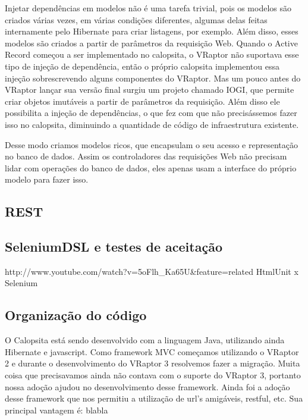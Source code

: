 Injetar dependências em modelos não é uma tarefa trivial, pois os modelos são criados várias vezes, em várias condições
diferentes, algumas delas feitas internamente pelo Hibernate para criar listagens, por exemplo. Além disso, esses
modelos são criados a partir de parâmetros da requisição Web. Quando o Active Record começou a ser implementado no 
calopsita, o VRaptor não suportava esse tipo de injeção de dependência, então o próprio calopsita implementou essa
injeção sobrescrevendo alguns componentes do VRaptor. Mas um pouco antes do VRaptor lançar sua versão final surgiu
um projeto \opensource chamado IOGI, que permite criar objetos imutáveis a partir de parâmetros da requisição.
Além disso ele possibilita a injeção de dependências, o que fez com que não precisássemos fazer isso no calopsita,
diminuindo a quantidade de código de infraestrutura existente.

Desse modo criamos modelos ricos, que encapsulam o seu acesso e representação no banco de dados. Assim os controladores
das requisições Web não precisam lidar com operações do banco de dados, eles apenas usam a interface do próprio modelo
para fazer isso.


\subsection{REST}

\subsection{SeleniumDSL e testes de aceitação}
http://www.youtube.com/watch?v=5oFlh_Ka65U&feature=related
HtmlUnit x Selenium

\subsection{Organização do código}
O Calopsita está sendo desenvolvido com a linguagem Java, utilizando ainda Hibernate e javascript. Como framework MVC começamos utilizando o VRaptor 2 e durante o desenvolvimento do VRaptor 3 resolvemos fazer a migração. Muita coisa que precisavamos ainda não contava com o suporte do VRaptor 3, portanto nossa adoção ajudou no desenvolvimento desse framework. Ainda foi a adoção desse framework que nos permitiu a utilização de url's amigáveis, restful, etc. Sua principal vantagem é: blabla